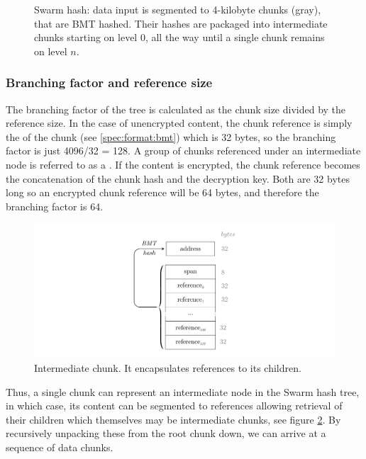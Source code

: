 \begin{figure}[htbp]
\centering
\resizebox{1\textwidth}{!}{
    
}
\caption[Swarm hash \statusgreen]{Swarm hash: data input is segmented to 4-kilobyte chunks (gray), that are BMT hashed. Their hashes are packaged into intermediate chunks starting on level $0$, all the way until a single chunk remains on level $n$. }
\label{fig:Swarm-hash}
\end{figure}

\subsubsection{Branching factor and reference size}

The branching factor of the tree is calculated as the chunk size divided by the reference size. In the case of unencrypted content, the chunk reference is simply the  of the chunk (see \ref{spec:format:bmt}) which is 32 bytes, so the branching factor is just 4096/32 =  128. A group of chunks referenced under an intermediate node is referred to as a . If the content is encrypted, the chunk reference becomes the concatenation of the chunk hash and the decryption key. Both are 32 bytes long so an encrypted chunk reference will be 64 bytes, and therefore the branching factor is 64. 


\begin{figure}[htbp]
\centering
\includegraphics[width=\textwidth]{fig/intermediate-chunk-3.pdf}
\caption[Intermediate chunk \statusgreen]{Intermediate chunk. It encapsulates references to its children.}
\label{fig:intermediate-chunk}
\end{figure}

Thus, a single chunk can represent an intermediate node in the Swarm hash tree, in which case, its content can be segmented to references allowing retrieval of their children which themselves may be intermediate chunks, see figure \ref{fig:intermediate-chunk}. By recursively unpacking these from the root chunk down, we can arrive at a sequence of data chunks. 

